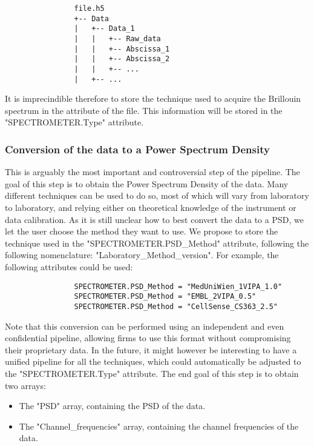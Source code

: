 \documentclass{article}
\begin{document}
            \begin{verbatim}
                file.h5
                +-- Data
                |   +-- Data_1
                |   |   +-- Raw_data
                |   |   +-- Abscissa_1
                |   |   +-- Abscissa_2
                |   |   +-- ...
                |   +-- ...
            \end{verbatim}

            It is imprecindible therefore to store the technique used to acquire the Brillouin spectrum in the attribute of the file. This information will be stored in the "SPECTROMETER.Type" attribute. 
    
        \subsubsection{Conversion of the data to a Power Spectrum Density}

            This is arguably the most important and controversial step of the pipeline. The goal of this step is to obtain the Power Spectrum Density of the data. Many different techniques can be used to do so, most of which will vary from laboratory to laboratory, and relying either on theoretical knowledge of the instrument or data calibration. As it is still unclear how to best convert the data to a PSD, we let the user choose the method they want to use. We propose to store the technique used in the "SPECTROMETER.PSD\_Method" attribute, following the following nomenclature: "Laboratory\_Method\_version". For example, the following attributes could be used:

            \begin{verbatim}
                SPECTROMETER.PSD_Method = "MedUniWien_1VIPA_1.0"
                SPECTROMETER.PSD_Method = "EMBL_2VIPA_0.5"
                SPECTROMETER.PSD_Method = "CellSense_CS363_2.5"
            \end{verbatim}

            Note that this conversion can be performed using an independent and even confidential pipeline, allowing firms to use this format without compromising their proprietary data. In the future, it might however be interesting to have a unified pipeline for all the techniques, which could automatically be adjusted to the "SPECTROMETER.Type" attribute. The end goal of this step is to obtain two arrays: 
            \begin{itemize}
                \item The "PSD" array, containing the PSD of the data.
                \item The "Channel\_frequencies" array, containing the channel frequencies of the data.
            \end{itemize}
\end{document}
